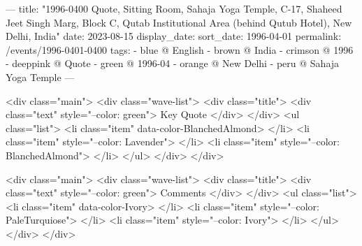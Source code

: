 ---
title: "1996-0400 Quote, Sitting Room, Sahaja Yoga Temple, C-17, Shaheed Jeet Singh Marg, Block C, Qutab Institutional Area (behind Qutub Hotel), New Delhi, India"
date: 2023-08-15
display_date: 
sort_date: 1996-04-01
permalink: /events/1996-0401-0400
tags:
  - blue @ English
  - brown @ India
  - crimson @ 1996
  - deeppink @ Quote
  - green @ 1996-04
  - orange @ New Delhi
  - peru @ Sahaja Yoga Temple
---

<div class="main">
  <div class="wave-list">
    <div class="title">
      <div class="text" style="--color: green">
        Key Quote
      </div>
    </div>
    <ul class="list">
        <li class="item" data-color-BlanchedAlmond>
        </li>
        <li class="item" style="--color: Lavender">
        </li>
        <li class="item" style="--color: BlanchedAlmond">
        </li>
      </ul>
  </div>
</div>

<div class="main">
  <div class="wave-list">
    <div class="title">
      <div class="text" style="--color: green">
        Comments
      </div>
    </div>
    <ul class="list">
        <li class="item" data-color-Ivory>
        </li>
        <li class="item" style="--color: PaleTurquiose">
        </li>
        <li class="item" style="--color: Ivory">
        </li>
      </ul>
  </div>
</div>